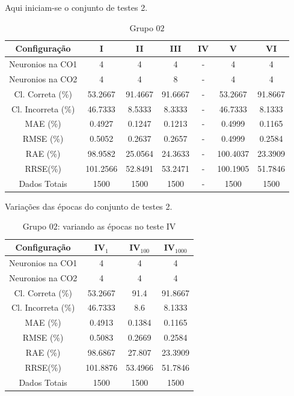 \documentclass[journal, a4paper]{IEEEtran}
\begin{document}
Aqui iniciam-se o conjunto de testes 2. 

\begin{table}[H]
	\begin{center}
		\caption{Grupo $02$}
		\label{grupo02}
		\begin{tabular}{|c|c|c|c|c|c|c|}\hline	
			\textbf{Configuração} &\textbf{I}&\textbf{II}&\textbf{III}&\textbf{IV}&\textbf{V}&\textbf{VI} \\ \hline 
			{Neuronios na CO1} & 4 & 4 & 4 & - & 4 & 4 \\ \hline
			{Neuronios na CO2} & 4 & 4 & 8 & - & 4 & 4 \\ \hline
			{Cl. Correta (\%)} & 53.2667 & 91.4667 & 91.6667  & - & 53.2667 &  91.8667 \\ \hline
			{Cl. Incorreta (\%)} & 46.7333 & 8.5333 & 8.3333 & - & 46.7333 & 8.1333 \\ \hline
			{MAE (\%)} & 0.4927 &  0.1247 & 0.1213 & - & 0.4999 & 0.1165 \\ \hline
			{RMSE (\%)} &0.5052 & 0.2637 & 0.2657 & - & 0.4999 & 0.2584 \\ \hline
			{RAE (\%)} & 98.9582 & 25.0564 & 24.3633 & - & 100.4037 & 23.3909 \\ \hline
			{RRSE(\%)} & 101.2566 & 52.8491 & 53.2471 & - & 100.1905 & 51.7846 \\ \hline
			{Dados Totais} & 1500 & 1500  & 1500 & - & 1500 & 1500 \\ \hline
		\end{tabular}  
	\end{center}
\end{table}

Variações das épocas do conjunto de testes 2. 

\begin{table}[H]
	\begin{center}
		\caption{Grupo $02$: variando as épocas no teste IV}
		\label{grupo02IV}
		\begin{tabular}{|c|c|c|c|}\hline	
			\textbf{Configuração} &$\textbf{IV}_{1}$&$\textbf{IV}_{100}$&$\textbf{IV}_{1000}$ \\ \hline 
			{Neuronios na CO1}   & 4      & 4     & 4      \\ \hline
			{Neuronios na CO2}   & 4      & 4     & 4      \\ \hline
			{Cl. Correta (\%)}   & 53.2667   & 91.4   & 91.8667  \\ \hline
			{Cl. Incorreta (\%)} & 46.7333   & 8.6    & 8.1333   \\ \hline
			{MAE (\%)}           & 0.4913   & 0.1384  & 0.1165   \\ \hline
			{RMSE (\%)}          & 0.5083   & 0.2669  & 0.2584   \\ \hline
			{RAE (\%)}           & 98.6867 & 27.807 & 23.3909   \\ \hline
			{RRSE(\%)}           & 101.8876 & 53.4966 & 51.7846  \\ \hline
			{Dados Totais}       & 1500   & 1500  & 1500   \\ \hline
		\end{tabular}  
	\end{center}
\end{table}
\end{document}

